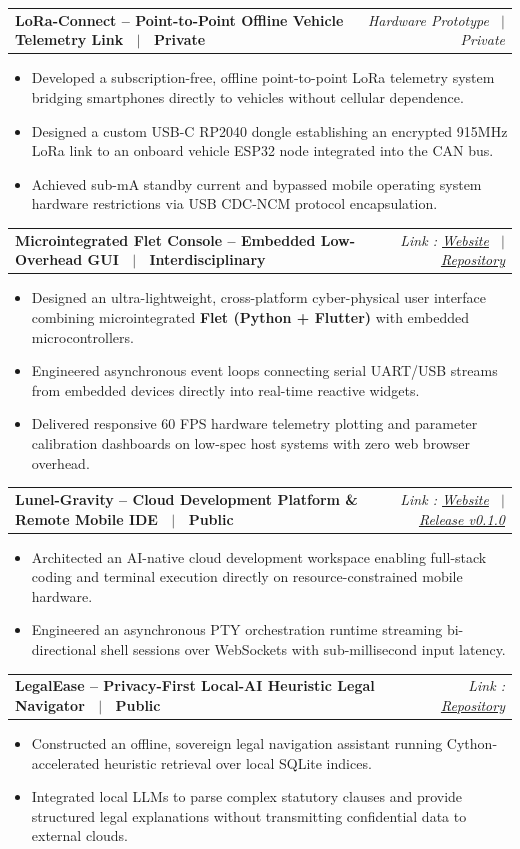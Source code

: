 \documentclass[letterpaper,10pt]{article}
\makeatletter
\newcommand{\resumeProjectHeading}[2]{
  \vspace{-2pt}\item
    \begin{tabular*}{\linewidth}[t]{l@{\extracolsep{\fill}}r}
      \textbf{#1} & \textit{\small #2} \\
    \end{tabular*}\vspace{-3pt}
}
\newcommand{\resumeItemListStart}{\begin{itemize}[leftmargin=14pt, labelsep=4pt, itemsep=0.5pt, parsep=0pt]}
\newcommand{\resumeItemListEnd}{\end{itemize}\vspace{-3pt}}
\makeatother
\begin{document}
    \resumeProjectHeading
      {LoRa-Connect -- Point-to-Point Offline Vehicle Telemetry Link \ $|$ \ Private}{Hardware Prototype \ $|$ \ Private}
      \resumeItemListStart
        \item{Developed a subscription-free, offline point-to-point LoRa telemetry system bridging smartphones directly to vehicles without cellular dependence.}
        \item{Designed a custom USB-C RP2040 dongle establishing an encrypted 915MHz LoRa link to an onboard vehicle ESP32 node integrated into the CAN bus.}
        \item{Achieved sub-mA standby current and bypassed mobile operating system hardware restrictions via USB CDC-NCM protocol encapsulation.}
      \resumeItemListEnd

    \resumeProjectHeading
      {Microintegrated Flet Console -- Embedded Low-Overhead GUI \ $|$ \ Interdisciplinary}{Link : \href{https://flet.dev}{Website} \ $|$ \ \href{https://github.com/seeramsujay/microintegrated-flet}{Repository}}
      \resumeItemListStart
        \item{Designed an ultra-lightweight, cross-platform cyber-physical user interface combining microintegrated \textbf{Flet (Python + Flutter)} with embedded microcontrollers.}
        \item{Engineered asynchronous event loops connecting serial UART/USB streams from embedded devices directly into real-time reactive widgets.}
        \item{Delivered responsive 60 FPS hardware telemetry plotting and parameter calibration dashboards on low-spec host systems with zero web browser overhead.}
      \resumeItemListEnd

    \resumeProjectHeading
      {Lunel-Gravity -- Cloud Development Platform \& Remote Mobile IDE \ $|$ \ Public}{Link : \href{https://lunel.dev}{Website} \ $|$ \ \href{https://github.com/seeramsujay/lunel-gravity/releases/tag/v0.1.0}{Release v0.1.0}}
      \resumeItemListStart
        \item{Architected an AI-native cloud development workspace enabling full-stack coding and terminal execution directly on resource-constrained mobile hardware.}
        \item{Engineered an asynchronous PTY orchestration runtime streaming bi-directional shell sessions over WebSockets with sub-millisecond input latency.}
      \resumeItemListEnd

    \resumeProjectHeading
      {LegalEase -- Privacy-First Local-AI Heuristic Legal Navigator \ $|$ \ Public}{Link : \href{https://github.com/seeramsujay/legal-ease}{Repository}}
      \resumeItemListStart
        \item{Constructed an offline, sovereign legal navigation assistant running Cython-accelerated heuristic retrieval over local SQLite indices.}
        \item{Integrated local LLMs to parse complex statutory clauses and provide structured legal explanations without transmitting confidential data to external clouds.}
      \resumeItemListEnd
\end{document}
